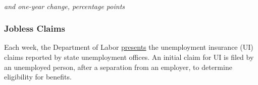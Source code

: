 \begin{minipage}{0.76\textwidth}
\\
\footnotesize{\textit{and one-year change, percentage points}}
\end{minipage}
\vspace*{-6.5mm}

\begin{minipage}{0.275\textwidth}
\footnotesize
{}
\end{minipage} \hspace{-3mm}
\begin{minipage}{0.275\textwidth}
\footnotesize
{}
\end{minipage} \hspace{-3mm}
\begin{minipage}{0.28\textwidth}
\footnotesize
{}
\end{minipage}

\begin{minipage}{0.76\textwidth}
\end{minipage}
\newpage
\subsubsection*{Jobless Claims}
\begin{minipage}{0.76\textwidth}   
\small Each week, the Department of Labor \href{https://www.dol.gov/ui/data.pdf}{presents} the unemployment insurance (UI) claims reported by state unemployment offices. An initial claim for UI is filed by an unemployed person, after a separation from an employer, to determine eligibility for benefits.
\end{minipage}
\vspace{1mm}

